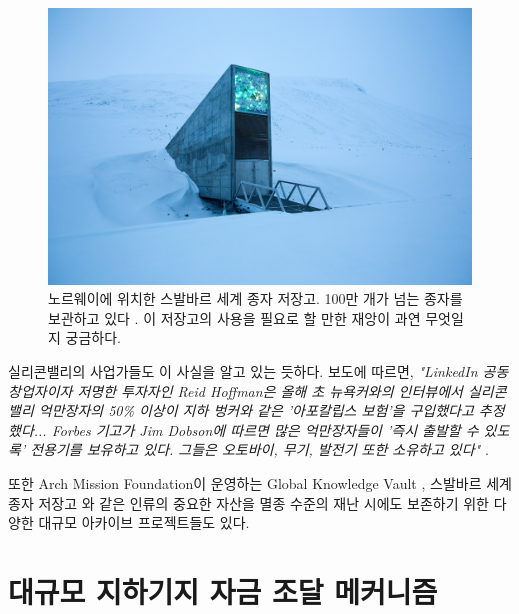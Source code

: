 \documentclass[10pt,twocolumn,letterpaper]{article}
\begin{document}
\begin{figure}[t]
\begin{center}
   \includegraphics[width=1\linewidth]{svalbard.jpg}
\end{center}
   \caption{노르웨이에 위치한 스발바르 세계 종자 저장고. 100만 개가 넘는 종자를 보관하고 있다 \cite{24}. 이 저장고의 사용을 필요로 할 만한 재앙이 과연 무엇일지 궁금하다.}
\label{fig:8}
\label{fig:onecol}
\end{figure}

실리콘밸리의 사업가들도 이 사실을 알고 있는 듯하다. 보도에 따르면, \textit{"LinkedIn 공동 창업자이자 저명한 투자자인 Reid Hoffman은 올해 초 뉴욕커와의 인터뷰에서 실리콘밸리 억만장자의 50\% 이상이 지하 벙커와 같은 '아포칼립스 보험'을 구입했다고 추정했다... Forbes 기고가 Jim Dobson에 따르면 많은 억만장자들이 '즉시 출발할 수 있도록' 전용기를 보유하고 있다. 그들은 오토바이, 무기, 발전기 또한 소유하고 있다"} \cite{28}.

또한 Arch Mission Foundation이 운영하는 Global Knowledge Vault \cite{29}, 스발바르 세계 종자 저장고 \cite{30}와 같은 인류의 중요한 자산을 멸종 수준의 재난 시에도 보존하기 위한 다양한 대규모 아카이브 프로젝트들도 있다.

\section{대규모 지하기지 자금 조달 메커니즘}
\end{document}
